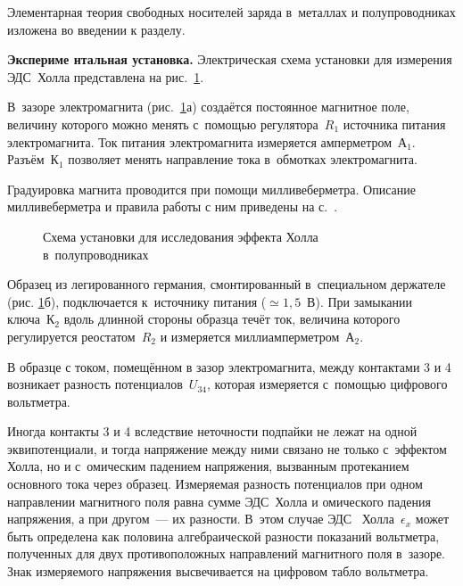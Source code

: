 


Элементарная теория свободных носителей заряда в~металлах и полупроводниках изложена во введении к разделу.

{\bf Экспериме
нтальная установка.} Электрическая схема установки для измерения ЭДС~Холла представлена на рис.~\ref{fig3.4.1}.

В~зазоре электромагнита (рис.~\ref{fig3.4.1}а) создаётся постоянное магнитное поле, величину которого можно менять с~помощью регулятора~$R_1$ источника питания электромагнита. Ток питания электромагнита измеряется амперметром~А$_1$. Разъём~К$_1$ позволяет менять направление тока в~обмотках электромагнита.

Градуировка магнита проводится при помощи милливеберметра. Описание милливеберметра и правила работы с ним приведены на с.~\pageref{MWB}.

\begin{figure}
\caption{Схема установки для исследования эффекта Холла в~полупроводниках}
\label{fig3.4.1}
\end{figure}

Образец из легированного германия, смонтированный в~специальном держателе (рис. \ref{fig3.4.1}б), подключается к~источнику питания ($\simeq 1,5$~В). При замыкании ключа~К$_2$ вдоль длинной стороны образца течёт ток, величина которого регулируется реостатом~$R_2$ и измеряется миллиамперметром~А$_2$.

В образце с током, помещённом в зазор электромагнита, между контактами 3 и 4 возникает разность потенциалов~$U_{34}$, которая измеряется с~помощью цифрового вольтметра.

Иногда контакты 3 и 4 вследствие неточности подпайки не лежат на одной эквипотенциали, и тогда напряжение между ними связано не только с~эффектом Холла, но и с~омическим падением напряжения, вызванным протеканием основного тока  через образец. Измеряемая разность потенциалов при одном направлении магнитного поля равна сумме ЭДС~Холла и омического падения напряжения, а при другом~--- их разности. В~этом случае ЭДС ~Холла~$\epsilon_x$ может быть определена как половина алгебраической разности показаний вольтметра, полученных для двух противоположных направлений магнитного поля в~зазоре. Знак измеряемого напряжения высвечивается на цифровом табло вольтметра.


